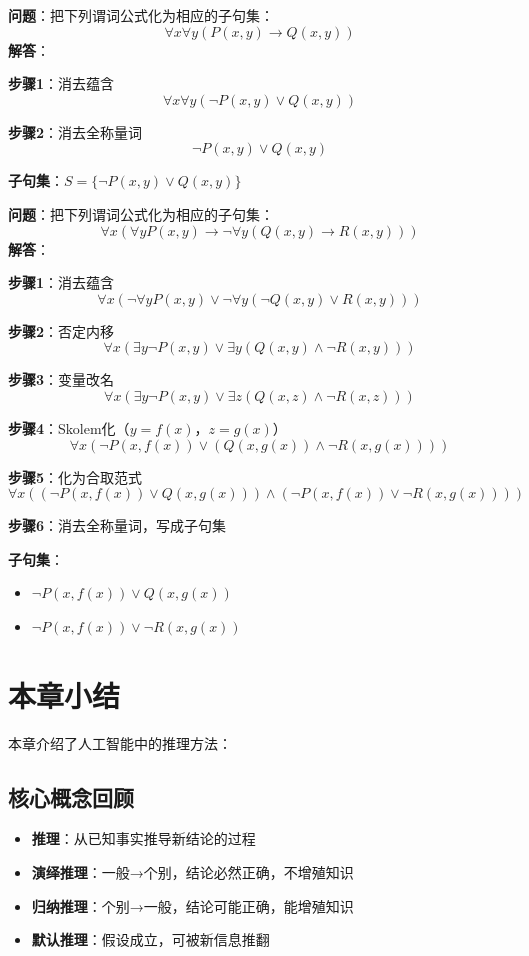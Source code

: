 \begin{examplebox}[例题3.18 子句集转换]
\textbf{问题}：把下列谓词公式化为相应的子句集：
$$\forall x \forall y(P(x,y) \to Q(x,y))$$
\tcblower
\textbf{解答}：

\textbf{步骤1}：消去蕴含
$$\forall x \forall y(\neg P(x,y) \lor Q(x,y))$$

\textbf{步骤2}：消去全称量词
$$\neg P(x,y) \lor Q(x,y)$$

\textbf{子句集}：$S = \{\neg P(x,y) \lor Q(x,y)\}$
\end{examplebox}

\begin{examplebox}[例题3.19 复杂子句集转换]
\textbf{问题}：把下列谓词公式化为相应的子句集：
$$\forall x(\forall y P(x,y) \to \neg \forall y(Q(x,y) \to R(x,y)))$$
\tcblower
\textbf{解答}：

\textbf{步骤1}：消去蕴含
$$\forall x(\neg \forall y P(x,y) \lor \neg \forall y(\neg Q(x,y) \lor R(x,y)))$$

\textbf{步骤2}：否定内移
$$\forall x(\exists y \neg P(x,y) \lor \exists y(Q(x,y) \land \neg R(x,y)))$$

\textbf{步骤3}：变量改名
$$\forall x(\exists y \neg P(x,y) \lor \exists z(Q(x,z) \land \neg R(x,z)))$$

\textbf{步骤4}：Skolem化（$y=f(x)$，$z=g(x)$）
$$\forall x(\neg P(x,f(x)) \lor (Q(x,g(x)) \land \neg R(x,g(x))))$$

\textbf{步骤5}：化为合取范式
$$\forall x((\neg P(x,f(x)) \lor Q(x,g(x))) \land (\neg P(x,f(x)) \lor \neg R(x,g(x))))$$

\textbf{步骤6}：消去全称量词，写成子句集

\textbf{子句集}：
\begin{itemize}[itemsep=0pt]
    \item $\neg P(x,f(x)) \lor Q(x,g(x))$
    \item $\neg P(x,f(x)) \lor \neg R(x,g(x))$
\end{itemize}
\end{examplebox}

\section{本章小结}

本章介绍了人工智能中的推理方法：

\subsection{核心概念回顾}
\begin{itemize}[leftmargin=2em,itemsep=0pt]
    \item \textbf{推理}：从已知事实推导新结论的过程
    \item \textbf{演绎推理}：一般→个别，结论必然正确，不增殖知识
    \item \textbf{归纳推理}：个别→一般，结论可能正确，能增殖知识
    \item \textbf{默认推理}：假设成立，可被新信息推翻
\end{itemize}

